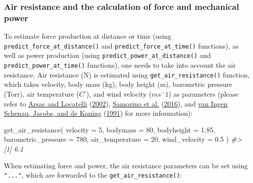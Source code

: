 \documentclass[fleqn,10pt,lineno]{wlpeerj} %
\newenvironment{Shaded}{\begin{snugshade}}{\end{snugshade}}
\newcommand{\AttributeTok}[1]{\textcolor[rgb]{0.77,0.63,0.00}{#1}}
\newcommand{\CommentTok}[1]{\textcolor[rgb]{0.56,0.35,0.01}{\textit{#1}}}
\newcommand{\DecValTok}[1]{\textcolor[rgb]{0.00,0.00,0.81}{#1}}
\newcommand{\FloatTok}[1]{\textcolor[rgb]{0.00,0.00,0.81}{#1}}
\newcommand{\FunctionTok}[1]{\textcolor[rgb]{0.00,0.00,0.00}{#1}}
\newcommand{\NormalTok}[1]{#1}
\begin{document}
\hypertarget{air-resistance-and-the-calculation-of-force-and-mechanical-power}{%
\subsubsection{Air resistance and the calculation of force and mechanical power}\label{air-resistance-and-the-calculation-of-force-and-mechanical-power}}

To estimate force production at distance or time (using \texttt{predict\_force\_at\_distance()} and \texttt{predict\_force\_at\_time()} functions), as well as power production (using \texttt{predict\_power\_at\_distance()} and \texttt{predict\_power\_at\_time()} functions), one needs to take into account the air resistance. Air resistance (N) is estimated using \texttt{get\_air\_resistance()} function, which takes velocity, body mass (kg), body height (m), barometric pressure (Torr), air temperature (\(C^\circ\)), and wind velocity (\(ms^-1\)) as parameters (please refer to \protect\hyperlink{ref-arsacModelingEnergetics100m2002}{Arsac and Locatelli} (\protect\hyperlink{ref-arsacModelingEnergetics100m2002}{2002}), \protect\hyperlink{ref-samozinoSimpleMethodMeasuring2016}{Samozino et al.} (\protect\hyperlink{ref-samozinoSimpleMethodMeasuring2016}{2016}), and \protect\hyperlink{ref-vaningenschenauCanCyclePower1991}{van Ingen Schenau, Jacobs, and de Koning} (\protect\hyperlink{ref-vaningenschenauCanCyclePower1991}{1991}) for more information):

\begin{Shaded}
\begin{Highlighting}[]
\FunctionTok{get\_air\_resistance}\NormalTok{(}
  \AttributeTok{velocity =} \DecValTok{5}\NormalTok{,}
  \AttributeTok{bodymass =} \DecValTok{80}\NormalTok{,}
  \AttributeTok{bodyheight =} \FloatTok{1.85}\NormalTok{,}
  \AttributeTok{barometric\_pressure =} \DecValTok{780}\NormalTok{,}
  \AttributeTok{air\_temperature =} \DecValTok{20}\NormalTok{,}
  \AttributeTok{wind\_velocity =} \FloatTok{0.5}
\NormalTok{)}
\CommentTok{\#\textgreater{} [1] 6.1}
\end{Highlighting}
\end{Shaded}

When estimating force and power, the air resistance parameters can be set using \texttt{"..."}, which are forwarded to the \texttt{get\_air\_resistance()}:
\end{document}
